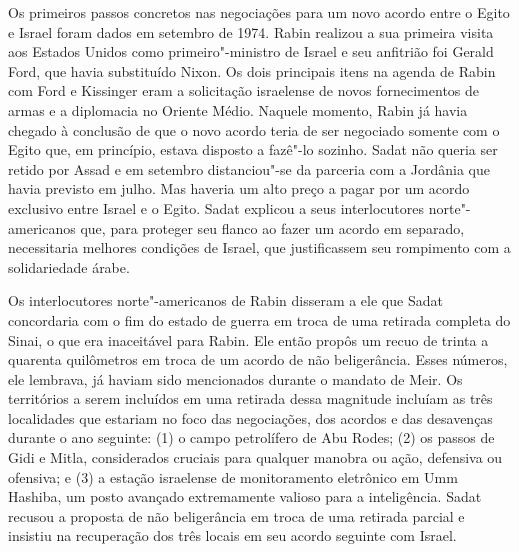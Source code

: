 Os primeiros passos concretos nas negociações para um novo acordo entre
o Egito e Israel foram dados em setembro de 1974. Rabin realizou a sua
primeira visita aos Estados Unidos como primeiro"-ministro de Israel e
seu anfitrião foi Gerald Ford, que havia substituído Nixon. Os dois
principais itens na agenda de Rabin com Ford e Kissinger eram a
solicitação israelense de novos fornecimentos de armas e a diplomacia no
Oriente Médio. Naquele momento, Rabin já havia chegado à conclusão de que o
novo acordo teria de ser negociado somente com o Egito que, em
princípio, estava disposto a fazê"-lo sozinho. Sadat não queria ser
retido por Assad e em setembro distanciou"-se da parceria com a Jordânia
que havia previsto em julho. Mas haveria um alto preço a pagar por um
acordo exclusivo entre Israel e o Egito. Sadat explicou a seus
interlocutores norte"-americanos que, para proteger seu flanco ao fazer um
acordo em separado, necessitaria melhores condições de Israel, que
justificassem seu rompimento com a solidariedade árabe.


Os interlocutores norte"-americanos de Rabin disseram a ele que Sadat
concordaria com o fim do estado de guerra em troca de uma retirada
completa do Sinai, o que era inaceitável para Rabin. Ele então propôs um
recuo de trinta a quarenta quilômetros em troca de um acordo de
não beligerância. Esses números, ele lembrava, já haviam sido
mencionados durante o mandato de Meir. Os territórios a serem incluídos
em uma retirada dessa magnitude incluíam as três localidades que
estariam no foco das negociações, dos acordos e das desavenças durante o
ano seguinte: (1) o campo petrolífero de Abu Rodes; (2) os passos de
Gidi e Mitla, considerados cruciais para qualquer manobra ou ação,
defensiva ou ofensiva; e (3) a estação israelense de monitoramento
eletrônico em Umm Hashiba, um posto avançado extremamente valioso para a
inteligência. Sadat recusou a proposta de não beligerância em troca de
uma retirada parcial e insistiu na recuperação dos três locais em seu
acordo seguinte com Israel.

